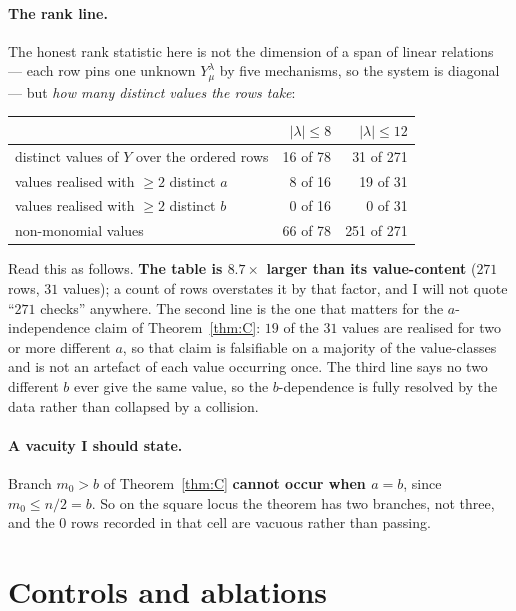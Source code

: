 \documentclass[11pt]{article}
\theoremstyle{definition}
\newcommand{\lam}{\lambda}
\begin{document}
\paragraph{The rank line.} The honest rank statistic here is not the dimension of a span of linear
relations --- each row pins one unknown $Y^\lam_\mu$ by five mechanisms, so the system is diagonal
--- but \emph{how many distinct values the rows take}:
\begin{center}
\begin{tabular}{lrr}
\toprule
 & $|\lam|\le8$ & $|\lam|\le12$\\ \midrule
distinct values of $Y$ over the ordered rows & 16 of 78 & 31 of 271\\
values realised with $\ge2$ distinct $a$ & 8 of 16 & 19 of 31\\
values realised with $\ge2$ distinct $b$ & 0 of 16 & 0 of 31\\
non-monomial values & 66 of 78 & 251 of 271\\
\bottomrule
\end{tabular}
\end{center}
Read this as follows. \textbf{The table is $8.7\times$ larger than its value-content}
($271$ rows, $31$ values); a count of rows overstates it by that factor, and I will not quote
``$271$ checks'' anywhere. The second line is the one that matters for the $a$-independence claim
of Theorem~\ref{thm:C}: $19$ of the $31$ values are realised for two or more different $a$, so
that claim is falsifiable on a majority of the value-classes and is not an artefact of each value
occurring once. The third line says no two different $b$ ever give the same value, so the
$b$-dependence is fully resolved by the data rather than collapsed by a collision.

\paragraph{A vacuity I should state.} Branch $m_0>b$ of Theorem~\ref{thm:C} \textbf{cannot occur
when $a=b$}, since $m_0\le n/2=b$. So on the square locus the theorem has two branches, not three,
and the $0$ rows recorded in that cell are vacuous rather than passing.

\section{Controls and ablations}\label{sec:controls}
\end{document}

